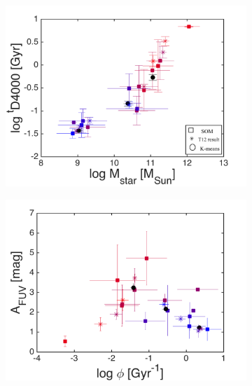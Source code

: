 \begin{figure}
\begin{subfigure}[b]{0.3\textwidth}
            \includegraphics[width=\textwidth]{images0.01/1d/f3.png}
        \end{subfigure}
        \hfill
        \begin{subfigure}[b]{0.3\textwidth}
            \includegraphics[width=\textwidth]{images0.01/1d/f4.png}
        \end{subfigure}
        \hfill
        \begin{subfigure}[b]{0.3\textwidth}

\end{subfigure}
\end{figure}
